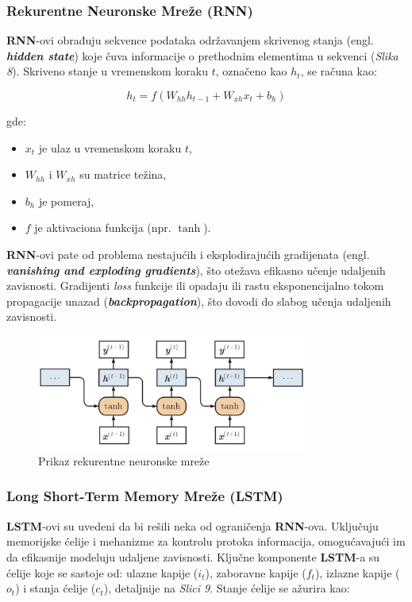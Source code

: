 \documentclass[12pt]{article}
\begin{document}
   \subsubsection{Rekurentne Neuronske Mreže (RNN)}
   \textbf{RNN}-ovi obrađuju sekvence podataka održavanjem skrivenog stanja (engl. \textbf{\textit{hidden state}}) 
   koje čuva informacije o prethodnim elementima u sekvenci (\textit{Slika 8}). 
   Skriveno stanje u vremenskom koraku \( t \), označeno kao \( h_t \), se računa kao:

   \[ h_t = f(W_{hh} h_{t-1} + W_{xh} x_t + b_h) \]

   gde:
   \begin{itemize}
      \vspace{-0.5cm}
      \setlength\itemsep{0.2em} %
      \item \( x_t \) je ulaz u vremenskom koraku \( t \),
      \item \( W_{hh} \) i \( W_{xh} \) su matrice težina,
      \item \( b_h \) je pomeraj,
      \item \( f \) je aktivaciona funkcija (npr. \(\tanh\)).
   \end{itemize}

   \textbf{RNN}-ovi pate od problema nestajućih i eksplodirajućih gradijenata (engl. \textbf{\textit{vanishing and exploding gradients}}), 
   što otežava efikasno učenje udaljenih zavisnosti. Gradijenti \textit{loss} funkcije ili opadaju ili rastu 
   eksponencijalno tokom propagacije unazad (\textbf{\textit{backpropagation}}), što dovodi 
   do slabog učenja udaljenih zavisnosti.
   
   \begin{figure}[h!]
      \centering
      \vspace{1.5cm} %
      \includegraphics[width=0.8\textwidth]{rnn.png}
      \caption{Prikaz rekurentne neuronske mreže}
      \label{fig:rnn}
   \end{figure}

   \subsubsection{Long Short-Term Memory Mreže (LSTM)}
   \textbf{LSTM}-ovi su uvedeni da bi rešili neka od ograničenja \textbf{RNN}-ova. 
   Uključuju memorijske ćelije i mehanizme za kontrolu protoka informacija, 
   omogućavajući im da efikasnije modeluju udaljene zavisnosti. Ključne komponente \textbf{LSTM}-a su ćelije 
   koje se sastoje od: ulazne kapije (\( i_t \)), zaboravne kapije (\( f_t \)), izlazne kapije (\( o_t \)) i 
   stanja ćelije (\( c_t \)), detaljnije na \textit{Slici 9}. Stanje ćelije se ažurira kao:
\end{document}
